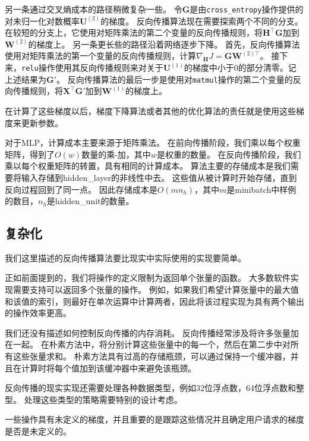   
另一条通过交叉熵成本的路径稍微复杂一些。
令$\bm{G}$是由\verb|cross_entropy|操作提供的对未归一化对数概率$\bm{U}^{(2)}$的梯度。
反向传播算法现在需要探索两个不同的分支。
在较短的分支上，它使用对矩阵乘法的第二个变量的反向传播规则，将$\bm{H}^\top \bm{G}$加到$\bm{W}^{(2)}$的梯度上。
另一条更长些的路径沿着网络逐步下降。
首先，反向传播算法使用对矩阵乘法的第一个变量的反向传播规则，计算$\nabla_{\bm{H}} J = \bm{G}\bm{W}^{(2)\top}$。
接下来，\verb|relu|操作使用其反向传播规则来对关于$\bm{U}^{(1)}$的梯度中小于0的部分清零。记上述结果为$\bm{G}'$。 
反向传播算法的最后一步是使用对\verb|matmul|操作的第二个变量的反向传播规则，将$\bm{X}^\top \bm{G}'$加到$\bm{W}^{(1)}$的梯度上。

在计算了这些梯度以后，梯度下降算法或者其他的优化算法的责任就是使用这些梯度来更新参数。

对于MLP，计算成本主要来源于矩阵乘法。
在前向传播阶段，我们乘以每个权重矩阵，得到了$O(w)$数量的乘-加，其中$w$是权重的数量。
在反向传播阶段，我们乘以每个权重矩阵的转置，具有相同的计算成本。
算法主要的存储成本是我们需要将输入存储到\gls{hidden_layer}的非线性中去。
这些值从被计算时开始存储，直到反向过程回到了同一点。
因此存储成本是$O(mn_h)$，其中$m$是minibatch中样例的数目，$n_h$是\gls{hidden_unit}的数量。
  
  
\subsection{复杂化}
\label{sec:complications}

我们这里描述的反向传播算法要比现实中实际使用的实现要简单。

正如前面提到的，我们将操作的定义限制为返回单个张量的函数。
大多数软件实现需要支持可以返回多个张量的操作。 
例如，如果我们希望计算张量中的最大值和该值的索引，则最好在单次运算中计算两者，因此将该过程实现为具有两个输出的操作效率更高。

我们还没有描述如何控制反向传播的内存消耗。
反向传播经常涉及将许多张量加在一起。
在朴素方法中，将分别计算这些张量中的每一个，然后在第二步中对所有这些张量求和。 
朴素方法具有过高的存储瓶颈，可以通过保持一个缓冲器，并且在计算时将每个值加到该缓冲器中来避免该瓶颈。

反向传播的现实实现还需要处理各种数据类型，例如32位浮点数，64位浮点数和整型。
处理这些类型的策略需要特别的设计考虑。

一些操作具有未定义的梯度，并且重要的是跟踪这些情况并且确定用户请求的梯度是否是未定义的。


